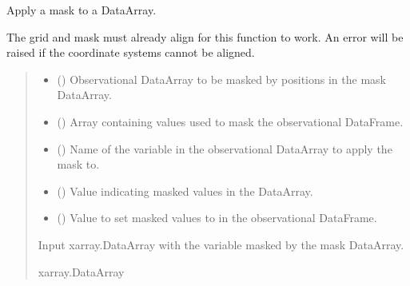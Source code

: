 \documentclass[letterpaper,10pt,english]{sphinxmanual}
\begin{document}
\begin{fulllineitems}
\label{\detokenize{misc:glomar_gridding.mask.mask_array}}
\pysigstartsignatures
\pysiglinewithargsret
{}
{\sphinxparamcomma {}\sphinxparamcomma {}\sphinxparamcomma {}\sphinxparamcomma {}}
{}
\pysigstopsignatures
\sphinxAtStartPar
Apply a mask to a DataArray.

\sphinxAtStartPar
The grid and mask must already align for this function to work. An error
will be raised if the coordinate systems cannot be aligned.
\begin{quote}\begin{description}
\begin{itemize}
\item {}
\sphinxAtStartPar
{} () \textendash{} Observational DataArray to be masked by positions in the mask
DataArray.

\item {}
\sphinxAtStartPar
{} () \textendash{} Array containing values used to mask the observational DataFrame.

\item {}
\sphinxAtStartPar
{} () \textendash{} Name of the variable in the observational DataArray to apply the mask
to.

\item {}
\sphinxAtStartPar
{} () \textendash{} Value indicating masked values in the DataArray.

\item {}
\sphinxAtStartPar
{} () \textendash{} Value to set masked values to in the observational DataFrame.

\end{itemize}

\sphinxAtStartPar
{} \textendash{} Input xarray.DataArray with the variable masked by the mask DataArray.

\sphinxAtStartPar
xarray.DataArray

\end{description}\end{quote}

\end{fulllineitems}
\end{document}
